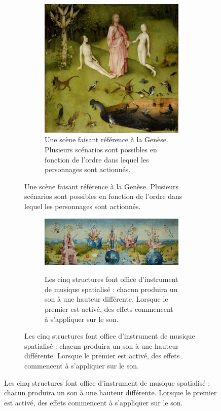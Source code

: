 \begin{landscape}
\begin{figure}
\begin{subfigure}[t]{0.3\textwidth}
            \begin{subfigure}[t]{\textwidth}\vskip 0pt
                \centering
                \includegraphics[width=\textwidth]{images/A2.png}
                \caption{Une scène faisant référence à la Genèse. Plusieurs scénarios sont possibles en fonction de l'ordre dans lequel les personnages sont actionnés.}
                \label{fig.a2}
            \end{subfigure}   
            \label{fig.a}
        \end{subfigure}\hspace{1cm}
        \begin{subfigure}[t]{0.7\textwidth}\vskip 0pt
            \centering
            \begin{subfigure}[t]{\textwidth}\vskip 0pt
                \centering
                \includegraphics[width=\textwidth]{images/B1.png}
                \label{fig.b1}
                \caption{Les cinq structures font office d'instrument de musique spatialisé : chacun produira un son à une hauteur différente. Lorsque le premier est activé, des effets commencent à s'appliquer sur le son.}

\end{subfigure}
\end{subfigure}
\end{figure}
\end{landscape}
